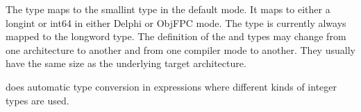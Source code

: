 The  type maps to the smallint type in the default
\fpc mode. It maps to either a longint or int64 in either Delphi or ObjFPC
mode. The  type is currently always mapped to the 
longword type. The definition of the  and 
types may change from one architecture to another and from one
compiler mode to another. They usually have the same size as the
underlying target architecture.




\fpc does automatic type conversion in expressions where different kinds of
integer types are used.
